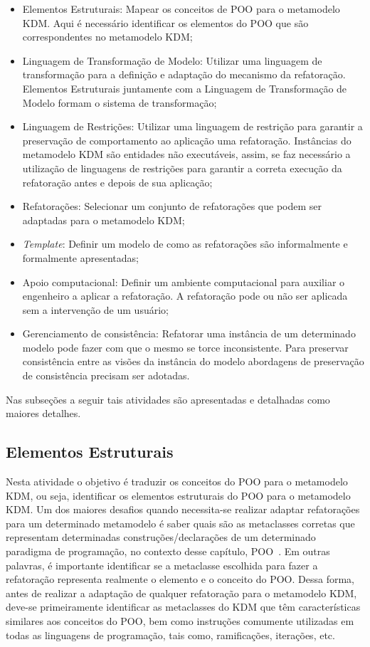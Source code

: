 \begin{itemize}
\item Elementos Estruturais: Mapear os conceitos de POO para o metamodelo KDM.
Aqui é necessário identificar os elementos do POO que são correspondentes no metamodelo KDM;
\item Linguagem de Transformação de Modelo: Utilizar uma linguagem de transformação para a definição e adaptação do mecanismo da refatoração. Elementos Estruturais juntamente com a Linguagem de Transformação de Modelo formam o sistema de transformação;
\item Linguagem de Restrições: Utilizar uma linguagem de restrição para garantir a preservação de comportamento ao aplicação uma refatoração. Instâncias do metamodelo KDM são entidades não executáveis, assim, se faz necessário a utilização de linguagens de restrições para garantir a correta execução da refatoração antes e depois de sua aplicação;
\item Refatorações: Selecionar um conjunto de refatorações que podem ser adaptadas para o metamodelo KDM;
\item \textit{Template}: Definir um modelo de como as refatorações são informalmente e formalmente apresentadas;
\item Apoio computacional: Definir um ambiente computacional para auxiliar o engenheiro a aplicar a refatoração. A refatoração pode ou não ser aplicada sem a intervenção de um usuário;
\item Gerenciamento de consistência: Refatorar uma instância de um determinado modelo pode fazer com que o mesmo se torce inconsistente. Para preservar consistência entre as visões da instância do modelo abordagens de preservação de consistência precisam ser adotadas.
\end{itemize}

Nas subseções a seguir tais atividades são apresentadas e detalhadas como maiores detalhes.

\subsection{Elementos Estruturais}\label{sec:mapeamento_POO_e_KDM}
Nesta atividade o objetivo é traduzir os conceitos do POO para o metamodelo KDM, ou seja, identificar os elementos estruturais do POO para o metamodelo KDM. Um dos maiores desafios quando necessita-se realizar adaptar refatorações para um determinado metamodelo é saber quais são as metaclasses corretas que representam determinadas construções/declarações de um determinado paradigma de programação, no contexto desse capítulo, POO~\cite{Zhang_2005, Boger_2003}. Em outras palavras, é importante identificar se a metaclasse escolhida para fazer a refatoração representa realmente o elemento e o conceito do POO. Dessa forma, antes de realizar a adaptação de qualquer refatoração para o metamodelo KDM, deve-se primeiramente identificar as metaclasses do KDM que têm características similares aos conceitos do POO, bem como instruções comumente utilizadas em todas as linguagens de programação, tais como, ramificações, iterações, etc. 

